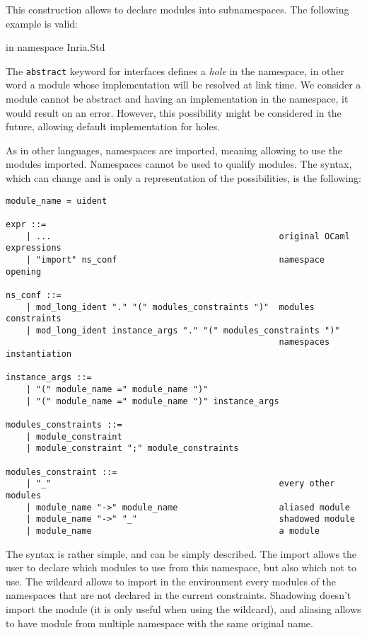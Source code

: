 \documentclass[11pt,a4paper]{article}
\begin{document}
This construction allows to declare modules into subnamespaces. The following
example is valid:

\begin{OCaml}
in namespace Inria.Std
\end{OCaml}

The \texttt{abstract} keyword for interfaces defines a \emph{hole} in the
namespace, in other word a module whose implementation will be resolved at link
time. We consider a module cannot be abstract and having an implementation in
the namespace, it would result on an error. However, this possibility might be
considered in the future, allowing default implementation for holes.

\medskip

As in other languages, namespaces are imported, meaning allowing to use the modules
imported. Namespaces cannot be used to qualify modules. The syntax, which can
change and is only a representation of the possibilities, is the following:

\begin{verbatim}
module_name = uident

expr ::=
    | ...                                             original OCaml expressions
    | "import" ns_conf                                namespace opening    

ns_conf ::=
    | mod_long_ident "." "(" modules_constraints ")"  modules constraints
    | mod_long_ident instance_args "." "(" modules_constraints ")"
                                                      namespaces instantiation 

instance_args ::=
    | "(" module_name =" module_name ")"
    | "(" module_name =" module_name ")" instance_args

modules_constraints ::=
    | module_constraint
    | module_constraint ";" module_constraints

modules_constraint ::=
    | "_"                                             every other modules
    | module_name "->" module_name                    aliased module
    | module_name "->" "_"                            shadowed module
    | module_name                                     a module
\end{verbatim}

The syntax is rather simple, and can be simply described. The import allows the
user to declare which modules to use from this namespace, but also which not to
use. The wildcard allows to import in the environment every modules of the
namespaces that are not declared in the current constraints. Shadowing doesn't
import the module (it is only useful when using the wildcard), and aliasing
allows to have module from multiple namespace with the same original name.
\end{document}

